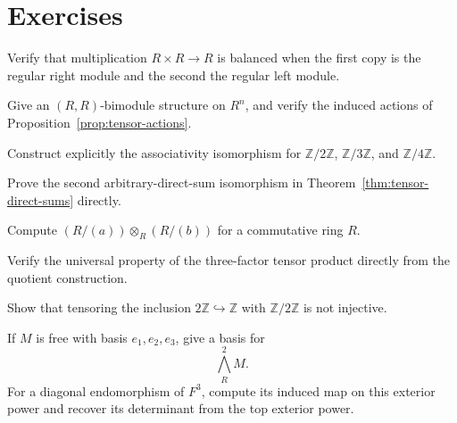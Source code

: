 \section*{Exercises}
\begin{exercise}[Basic] Verify that multiplication \(R\times R\to R\) is
balanced when the first copy is the regular right module and the second the
regular left module.\end{exercise}
\begin{exercise}[Core] Give an \((R,R)\)-bimodule structure on \(R^n\), and
verify the induced actions of Proposition~\ref{prop:tensor-actions}.
\end{exercise}
\begin{exercise}[Core] Construct explicitly the associativity isomorphism
for \(\mathbb Z/2\mathbb Z\), \(\mathbb Z/3\mathbb Z\), and
\(\mathbb Z/4\mathbb Z\).\end{exercise}
\begin{exercise}[Core] Prove the second arbitrary-direct-sum isomorphism in
Theorem~\ref{thm:tensor-direct-sums} directly.\end{exercise}
\begin{exercise}[Core] Compute \((R/(a))\otimes_R(R/(b))\) for a commutative
ring \(R\).\end{exercise}
\begin{exercise}[Further] Verify the universal property of the three-factor
tensor product directly from the quotient construction.\end{exercise}
\begin{exercise} Show that tensoring the inclusion
\(2\mathbb Z\hookrightarrow\mathbb Z\) with \(\mathbb Z/2\mathbb Z\) is not
injective.\end{exercise}
\begin{exercise}[Core] If \(M\) is free with basis \(e_1,e_2,e_3\), give a
basis for
\[
\bigwedge_R^2M.
\]
For a diagonal endomorphism of \(F^3\), compute its induced map on this
exterior power and recover its determinant from the top exterior power.
\end{exercise}
